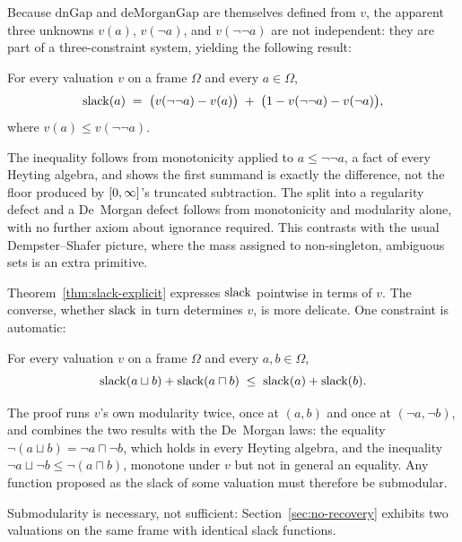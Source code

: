 Because $\mathrm{dnGap}$ and $\mathrm{deMorganGap}$ are themselves
defined from $v$, the apparent three unknowns $v(a)$, $v(\neg a)$, and
$v(\neg\neg a)$ are not independent: they are part of a three-constraint 
system, yielding the following result:

\begin{theorem}
\label{thm:slack-explicit}
For every valuation $v$ on a frame $\Omega$ and every $a \in \Omega$,
\[
  \mathrm{slack}(a) \;=\; \bigl(v(\neg\neg a) - v(a)\bigr)
  \;+\; \bigl(1 - v(\neg\neg a) - v(\neg a)\bigr),
\]
where $v(a) \le v(\neg\neg a)$.
\end{theorem}

\noindent
The inequality follows from monotonicity applied to
$a \le \neg\neg a$, a fact of every Heyting algebra, and shows the
first summand is exactly the difference, not the floor
produced by $[0,\infty]$'s truncated subtraction.  The split into a
regularity defect and a De~Morgan defect follows from monotonicity
and modularity alone, with no further axiom about ignorance required.
This contrasts with the usual Dempster--Shafer picture, where the
mass assigned to non-singleton, ambiguous sets is an extra primitive.

Theorem~\ref{thm:slack-explicit} expresses $\mathrm{slack}$ pointwise
in terms of $v$.  The converse, whether $\mathrm{slack}$ in turn determines
$v$, is more delicate.  One constraint is automatic:

\begin{theorem}
\label{thm:slack-submodular}
For every valuation $v$ on a frame $\Omega$ and every $a, b \in \Omega$,
\[
  \mathrm{slack}(a \sqcup b) + \mathrm{slack}(a \sqcap b) \;\le\; \mathrm{slack}(a) + \mathrm{slack}(b).
\]
\end{theorem}

\noindent
The proof runs $v$'s own modularity twice, once at $(a, b)$ and once
at $(\neg a, \neg b)$, and combines the two results with the De~Morgan
laws: the equality $\neg(a \sqcup b) = \neg a \sqcap \neg b$, which
holds in every Heyting algebra, and the inequality
$\neg a \sqcup \neg b \le \neg(a \sqcap b)$, monotone under $v$ but
not in general an equality.  Any function proposed as the slack of
some valuation must therefore be submodular.

\begin{remark}
\label{rem:no-recovery}
Submodularity is necessary, not sufficient:
Section~\ref{sec:no-recovery} exhibits two valuations on the same
frame with identical slack functions.
\end{remark}

